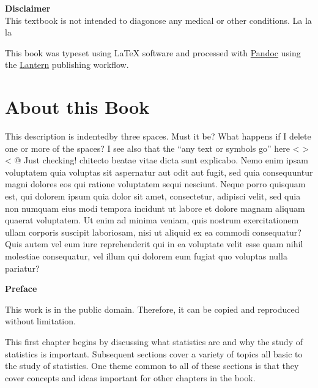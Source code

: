 \documentclass{book}
\begin{document}
\begin{flushleft}
\begin{description}
\end{description}

\textbf{Disclaimer} \\
  This textbook is not intended to diagonose any medical or other conditions.
  La la la

\vspace*{\fill}

This book was typeset using \LaTeX{} software and processed with \href{https://pandoc.org}{Pandoc} using the \href{http://lantern.northwestern.pub}{Lantern} publishing workflow.\\

\end{flushleft}

\addtocounter{page}{2}

\chapter*{About this Book}
This description is indentedby three spaces. Must it be? What happens if I
delete one or more of the spaces? I see also that the ``any text or symbols
go'' here \textless{} \textgreater{} \textless{} @ Just checking! chitecto
beatae vitae dicta sunt explicabo. Nemo enim ipsam voluptatem quia voluptas
sit aspernatur aut odit aut fugit, sed quia consequuntur magni dolores eos qui
ratione voluptatem sequi nesciunt. Neque porro quisquam est, qui dolorem ipsum
quia dolor sit amet, consectetur, adipisci velit, sed quia non numquam eius
modi tempora incidunt ut labore et dolore magnam aliquam quaerat voluptatem.
Ut enim ad minima veniam, quis nostrum exercitationem ullam corporis suscipit
laboriosam, nisi ut aliquid ex ea commodi consequatur? Quis autem vel eum iure
reprehenderit qui in ea voluptate velit esse quam nihil molestiae consequatur,
vel illum qui dolorem eum fugiat quo voluptas nulla pariatur?

\setcounter{tocdepth}{3}
\tableofcontents

\mainmatter

\textbf{Preface}

This work is in the public domain. Therefore, it can be copied and reproduced
without limitation.

This first chapter begins by discussing what statistics are and why the study
of statistics is important. Subsequent sections cover a variety of topics all
basic to the study of statistics. One theme common to all of these sections is
that they cover concepts and ideas important for other chapters in the book.
\end{document}
